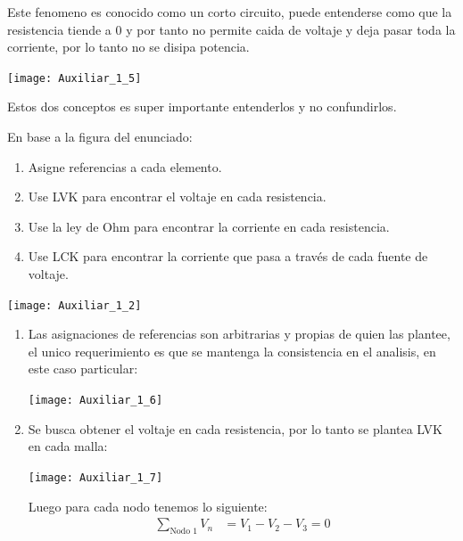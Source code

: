 \documentclass[
  11pt,
  letterpaper,
   addpoints,
  ]{exam}
\begin{document}
\begin{questions}
\begin{solution}
\begin{enumerate}
\begin{equation}
        \end{equation}
        Este fenomeno es conocido como un corto circuito, puede entenderse como que la resistencia tiende a 0 y por tanto no permite caida de voltaje y deja pasar toda la corriente, por lo tanto no se disipa potencia.
        \begin{center}
            \texttt{[image: Auxiliar\_1\_5]}
        \end{center}
        Estos dos conceptos es super importante entenderlos y no confundirlos.
    \end{enumerate}
    \end{solution}
\question  En base a la figura del enunciado:
\begin{enumerate}
    \item Asigne referencias a cada elemento.
    \item Use LVK para encontrar el voltaje en cada resistencia.
    \item Use la ley de Ohm para encontrar la corriente en cada resistencia.
    \item Use LCK para encontrar la corriente que pasa a través de cada fuente de voltaje.
\end{enumerate}
\begin{center}
    \texttt{[image: Auxiliar\_1\_2]}
\end{center}
\begin{solution}
   \begin{enumerate}
    \item Las asignaciones de referencias son arbitrarias y propias de quien las plantee, el unico requerimiento es que se mantenga la consistencia en el analisis, en este caso particular:
    \begin{center}
        \texttt{[image: Auxiliar\_1\_6]}
    \end{center}
    \item Se busca obtener el voltaje en cada resistencia, por lo tanto se plantea LVK en cada malla:
    \begin{center}
        \texttt{[image: Auxiliar\_1\_7]}
    \end{center}
    Luego para cada nodo tenemos lo siguiente:
    \begin{align}
        \sum_{\text{Nodo 1}} V_{n} &= V_{1} - V_{2} - V_{3} = 0\\

\end{align}
\end{enumerate}
\end{solution}
\end{questions}
\end{document}
